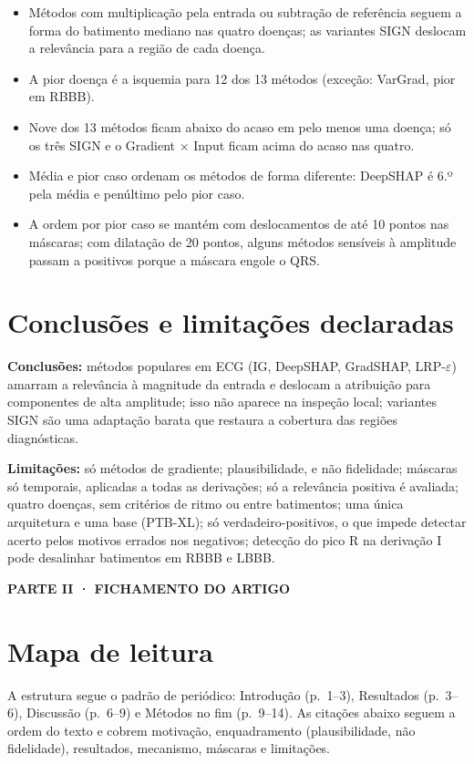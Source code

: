 \documentclass[11pt,a4paper]{article}
\newcommand{\partbar}[1]{\par\vspace{1.2em}\noindent\colorbox{black!80}{\parbox{\dimexpr\linewidth-2\fboxsep}{\color{white}\bfseries\sffamily\MakeUppercase{#1}}}\par\vspace{0.4em}}
\begin{document}
\begin{itemize}
\item Métodos com multiplicação pela entrada ou subtração de referência seguem a forma do batimento mediano nas quatro doenças; as variantes SIGN deslocam a relevância para a região de cada doença.
\item A pior doença é a isquemia para 12 dos 13 métodos (exceção: VarGrad, pior em RBBB).
\item Nove dos 13 métodos ficam abaixo do acaso em pelo menos uma doença; só os três SIGN e o Gradient $\times$ Input ficam acima do acaso nas quatro.
\item Média e pior caso ordenam os métodos de forma diferente: DeepSHAP é 6.º pela média e penúltimo pelo pior caso.
\item A ordem por pior caso se mantém com deslocamentos de até 10 pontos nas máscaras; com dilatação de 20 pontos, alguns métodos sensíveis à amplitude passam a positivos porque a máscara engole o QRS.
\end{itemize}

\section{Conclusões e limitações declaradas}
\textbf{Conclusões:} métodos populares em ECG (IG, DeepSHAP, GradSHAP, LRP-$\varepsilon$) amarram a relevância à magnitude da entrada e deslocam a atribuição para componentes de alta amplitude; isso não aparece na inspeção local; variantes SIGN são uma adaptação barata que restaura a cobertura das regiões diagnósticas.

\textbf{Limitações:} só métodos de gradiente; plausibilidade, e não fidelidade; máscaras só temporais, aplicadas a todas as derivações; só a relevância positiva é avaliada; quatro doenças, sem critérios de ritmo ou entre batimentos; uma única arquitetura e uma base (PTB-XL); só verdadeiro-positivos, o que impede detectar acerto pelos motivos errados nos negativos; detecção do pico R na derivação I pode desalinhar batimentos em RBBB e LBBB.

\partbar{Parte II · Fichamento do artigo}

\section{Mapa de leitura}
A estrutura segue o padrão de periódico: Introdução (p.~1--3), Resultados (p.~3--6), Discussão (p.~6--9) e Métodos no fim (p.~9--14). As citações abaixo seguem a ordem do texto e cobrem motivação, enquadramento (plausibilidade, não fidelidade), resultados, mecanismo, máscaras e limitações.
\end{document}
